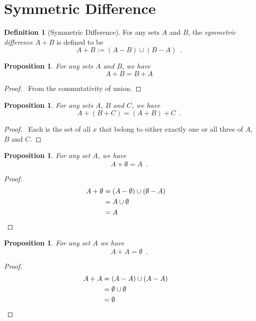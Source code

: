 \documentclass{report}
\let\qed\relax
\newtheorem{prop}[ax]{Proposition}
\theoremstyle{definition}
\newtheorem{df}[ax]{Definition}
\begin{document}
\section{Symmetric Difference}

\begin{df}[Symmetric Difference]
For any sets $A$ and $B$, the \emph{symmetric difference} $A + B$ is defined to be
\[ A + B := (A - B) \cup (B - A) \enspace . \]
\end{df}

\begin{prop}
For any sets $A$ and $B$, we have
\[ A + B = B + A \]
\end{prop}

\begin{proof}
\pf\ From the commutativity of union. \qed
\end{proof}

\begin{prop}
For any sets $A$, $B$ and $C$, we have
\[ A + (B + C) = (A + B) + C \enspace . \]
\end{prop}

\begin{proof}
\pf\ Each is the set of all $x$ that belong to either exactly one or all three of $A$, $B$ and $C$. \qed
\end{proof}

\begin{prop}
For any set $A$, we have
\[ A + \emptyset = A \enspace . \]
\end{prop}

\begin{proof}
\pf
\begin{align*}
A + \emptyset & = (A - \emptyset) \cup (\emptyset - A) \\
& = A \cup \emptyset \\
& = A & \qed
\end{align*}
\end{proof}

\begin{prop}
For any set $A$ we have
\[ A + A = \emptyset \enspace . \]
\end{prop}

\begin{proof}
\pf
\begin{align*}
A + A & = (A - A) \cup (A - A) \\
& = \emptyset \cup \emptyset \\
& = \emptyset & \qed
\end{align*}
\end{proof}
\end{document}
